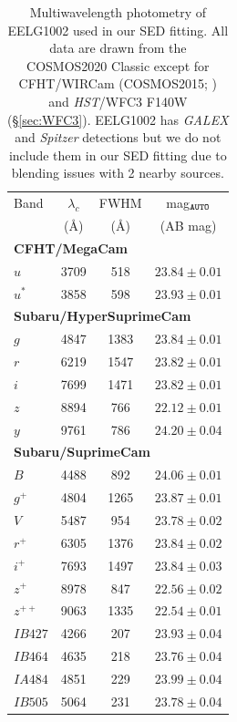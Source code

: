 \documentclass[twocolumn,tight,times,linenumbers]{aastex631}
\begin{document}
		\begin{table}
			\centering
			\caption{Multiwavelength photometry of EELG1002 used in our SED fitting. All data are drawn from the COSMOS2020 Classic \citep{Weaver2022} except for CFHT/WIRCam (COSMOS2015; \citealt{Laigle2016}) and \textit{HST}/WFC3 F140W (\S\ref{sec:WFC3}). EELG1002 has \textit{GALEX} and \textit{Spitzer} detections but we do not include them in our SED fitting due to blending issues with 2 nearby sources.}
			\label{table:photometry}
			\begin{tabular*}{\columnwidth}{@{\extracolsep{\fill}}lccc}
				\hline
				Band & $\lambda_c$ & FWHM & mag$_\textrm{\texttt{AUTO}}$ \\
				          & (\AA) & (\AA) & (AB mag) \\
				\hline
				\multicolumn{4}{l}{\textbf{CFHT/MegaCam}} \\
				$u$ & 3709 & 518 & $23.84\pm0.01$\\			
				$u^*$ & 3858 & 598 & $23.93\pm0.01$\\					
				\multicolumn{4}{l}{\textbf{Subaru/HyperSuprimeCam}} \\	
			    $g$ & 4847 & 1383 & $23.84\pm0.01$\\			
			    $r$ & 6219 & 1547& $23.82\pm0.01$\\			
			    $i$ & 7699 & 1471 & $23.82\pm0.01$\\		
			    $z$ &8894 & 766 & $22.12\pm0.01$\\
			    $y$ & 9761 & 786 & $24.20\pm0.04$\\	
				\multicolumn{4}{l}{\textbf{Subaru/SuprimeCam}} \\						
				$B$ & 4488 & 892 & $24.06\pm0.01$\\
				$g^+$ & 4804 & 1265 & $23.87\pm0.01$\\
				$V$ & 5487 & 954 & $23.78\pm0.02$\\
				$r^+$ & 6305 & 1376 & $23.84\pm0.02$\\
				$i^+$ & 7693 & 1497 & $23.84\pm0.03$\\
				$z^+$ & 8978 & 847 & $22.56\pm0.02$\\
				$z^{++}$ & 9063 &  1335 & $22.54\pm0.01$\\
				$IB427$ & 4266 & 207 & $23.93\pm0.04$\\
				$IB464$ & 4635 & 218 & $23.76\pm0.04$\\
				$IA484$ & 4851 & 229 & $23.99\pm0.04$\\
				$IB505$ & 5064 & 231 & $23.78\pm0.04$\\

\end{tabular*}
\end{table}
\end{document}
